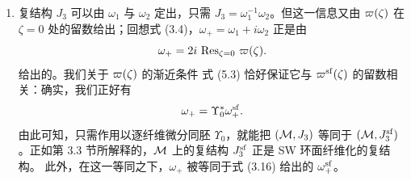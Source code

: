 \begin{enumerate}
\item 复结构 $J_3$ 可以由 $\omega_1$ 与 $\omega_2$ 定出，只需 $J_3 = \omega_1^{-1} \omega_2$。但这一信息又由 $\hsymp(\zeta)$ 在 $\zeta = 0$ 处的留数给出；回想式 (3.4)，$\omega_+ = \omega_1 + i \omega_2$ 正是由%
\begin{equation}
\omega_+ = 2i\,\Res_{\zeta = 0} \, \hsymp(\zeta).
\end{equation}
给出的。我们关于 $\hsymp(\zeta)$ 的渐近条件 式 (5.3) 恰好保证它与 $\hsymp^\sf(\zeta)$ 的留数相关：确实，我们正好有%
\begin{equation}
\omega_+ = \Upsilon_0^* \omega_+^\sf.
\end{equation}
由此可知，只需作用以逐纤维微分同胚 $\Upsilon_0$，就能把 $(\CM, J_3)$ 等同于 $(\CM, J_3^\sf)$。正如第 3.3 节所解释的，$\CM$ 上的复结构 $J_3^\sf$ 正是 SW 环面纤维化的复结构。%
此外，在这一等同之下，$\omega_+$ 被等同于式 (3.16) 给出的 $\omega_+^\sf$。%
\end{enumerate}
